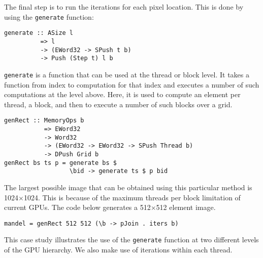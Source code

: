 The final step is to run the iterations for each pixel location. 
This is done by using the {\tt generate} function: 
\begin{small}
\begin{Verbatim}[samepage=true] 
generate :: ASize l 
          => l 
          -> (EWord32 -> SPush t b) 
          -> Push (Step t) l b
\end{Verbatim}
\end{small}

\noindent
{\tt generate} is a function that can be used at the thread or block level.
It takes a function from index to computation for that index and executes a 
number of such computations at the level above. Here, it is used to compute 
an element per thread, a block,  and then to execute a number of such blocks over a grid. 


\begin{small} 
\begin{verbatim} 
genRect :: MemoryOps b
           => EWord32
           -> Word32
           -> (EWord32 -> EWord32 -> SPush Thread b)
           -> DPush Grid b 
genRect bs ts p = generate bs $
                  \bid -> generate ts $ p bid 
\end{verbatim}
\end{small} %


The largest possible image that can be obtained using this particular 
method is 1024$\times$1024. This is because of the maximum threads per block 
limitation of current GPUs. The code below generates a 512$\times$512 element 
image. 
\begin{small} 
\begin{verbatim}
mandel = genRect 512 512 (\b -> pJoin . iters b)
\end{verbatim}
\end{small}

This case study illustrates the use of the {\tt generate} function at 
two different levels of the GPU hierarchy. We also make use of 
iterations within each thread.

